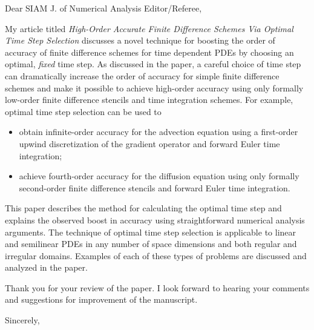 \documentclass[12pt]{letter}
\begin{document}
\address{}
\signature{Kevin T. Chu}

\begin{letter}
{
}

\opening{Dear SIAM J. of Numerical Analysis Editor/Referee,}

My article titled \emph{High-Order Accurate Finite Difference Schemes 
Via Optimal Time Step Selection} discusses a novel technique for boosting 
the order of accuracy of finite difference schemes for time dependent 
PDEs by choosing an optimal, \emph{fixed} time step.  As discussed in the 
paper, a careful choice of time step can dramatically increase the order of 
accuracy for simple finite difference schemes and make it possible to achieve 
high-order accuracy using only formally low-order finite difference stencils 
and time integration schemes.  For example, optimal time step selection can be 
used to 
\begin{itemize}
\item obtain infinite-order accuracy for the advection equation using 
      a first-order upwind discretization of the gradient operator and
      forward Euler time integration;
\item achieve fourth-order accuracy for the diffusion equation using only 
      formally second-order finite difference stencils and forward Euler 
      time integration. 
\end{itemize}
This paper describes the method for calculating the optimal time step and 
explains the observed boost in accuracy using straightforward numerical 
analysis arguments.  The technique of optimal time step selection is 
applicable to linear and semilinear PDEs in any number of space dimensions 
and both regular and irregular domains.  Examples of each of these types of 
problems are discussed and analyzed in the paper.

Thank you for your review of the paper.  I look forward to hearing your 
comments and suggestions for improvement of the manuscript.

\closing{Sincerely,}

\end{letter}
\end{document}
